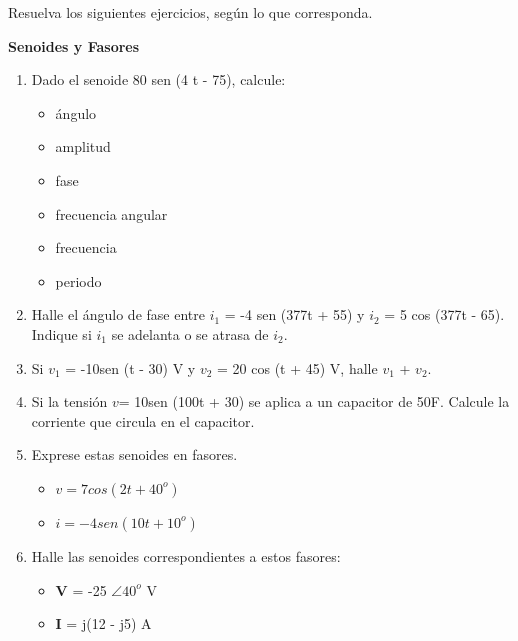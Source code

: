 \documentclass[12pt]{article}
\begin{document}
\noindent

\vspace{0.5cm}
\noindent Resuelva los siguientes ejercicios, según lo que corresponda. 

\textbf{Senoides y Fasores}

\begin{enumerate}
\item Dado el senoide 80 sen (4 \si{\pi}t - 75), calcule:
\begin{itemize} 
    \item  ángulo
    \item  amplitud
    \item  fase
    \item  frecuencia angular
    \item  frecuencia
    \item  periodo
    \end{itemize}
    
\item Halle el ángulo de fase entre $i_1$ = -4 sen (377t + 55) y  $i_2$ = 5 cos (377t - 65). Indique si $i_1$ se adelanta o se atrasa de $i_2$.

\item Si $v_1$ = -10sen (\si{\omega}t - 30) V y $v_2$ = 20 cos (\si{\omega}t + 45) V, halle $v_1$ + $v_2$.




\item Si la tensión $v$= 10sen (100t + 30) se aplica a un capacitor de 50\si{\mu}F. Calcule la corriente que circula en el capacitor.

\item Exprese estas senoides en fasores.
    \begin{itemize}
        \item $v = 7 cos(2t + 40^o)$
        \item $i = -4 sen(10t + 10^o)$
    \end{itemize}
  

\item Halle las senoides correspondientes a estos fasores:

    \begin{itemize}
        \item \textbf{V} = -25 $\angle 40^o$ V
        \item \textbf{I} = j(12 - j5) A
        
    \end{itemize}


\end{enumerate}
\end{document}
